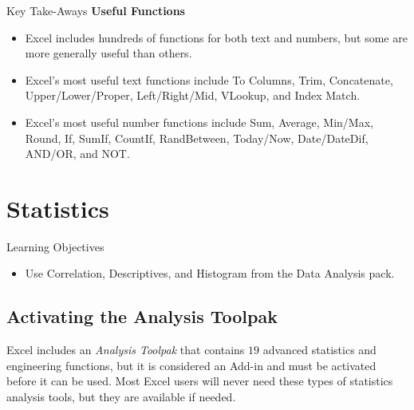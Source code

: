 \begin{enumerate}
\end{enumerate}

\begin{center}
	\begin{tkwbox}{Key Take-Aways}
		\textbf{Useful Functions}
		\\
		\begin{itemize}
			\setlength{\itemsep}{0pt}
			\setlength{\parskip}{0pt}
			\setlength{\parsep}{0pt}
			
			\item Excel includes hundreds of functions for both text and numbers, but some are more generally useful than others.  
			\item Excel's most useful text functions include To Columns, Trim, Concatenate, Upper/Lower/Proper, Left/Right/Mid, VLookup, and Index Match.
			\item Excel's most useful number functions include Sum, Average, Min/Max, Round, If, SumIf, CountIf, RandBetween, Today/Now, Date/DateDif, AND/OR, and NOT.
			
		\end{itemize}
	\end{tkwbox}
\end{center}

\section{Statistics}

\begin{center}
	\begin{objbox}{Learning Objectives}
		\begin{itemize}
			\setlength{\itemsep}{0pt}
			\setlength{\parskip}{0pt}
			\setlength{\parsep}{0pt}
			
			\item Use Correlation, Descriptives, and Histogram from the Data Analysis pack.
			
		\end{itemize}
	\end{objbox}
\end{center}

\subsection{Activating the Analysis Toolpak}

Excel includes an \textit{Analysis Toolpak} that contains $ 19 $ advanced statistics and engineering functions, but it is considered an Add-in and must be activated before it can be used. Most Excel users will never need these types of statistics analysis tools, but they are available if needed.


